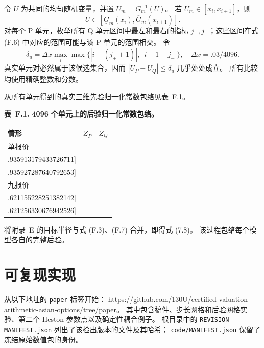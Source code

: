 令 \(U\) 为共同的均匀随机变量，并置 \(U_m=G_m^{-1}(U)\)。
若 \(U_m\in[x_i,x_{i+1}]\)，则
\[
U\in[\underline G_m(x_i),\overline G_m(x_{i+1})].
\tag{F.6}
\]
对每个 P 单元，枚举所有 Q 单元区间中最左和最右的指标 \(j_-,j_+\)；这些区间在式 (F.6) 中对应的范围可能与该 P 单元的范围相交。
令
\[
\delta_u=\Delta x\max_i\max\{|i-(j_++1)|,\ |i+1-j_-|\},
\quad \Delta x=.03/4096.
\tag{F.7}
\]
真实单元对必然属于该候选集合，因而
\(|U_P-U_Q|\le\delta_u\) 几乎处处成立。
所有比较均使用精确整数和分数。

从所有单元得到的真实三维先验归一化常数包络见表~F.1。

\noindent\textbf{表~F.1. 4096 个单元上的后验归一化常数包络。}
\begin{center}
\begin{tabularx}{\textwidth}{@{}l X X@{}}
\toprule
情形 & \(Z_P\) & \(Z_Q\) \\
\midrule
单报价 &
\(\begin{gathered}[c] [.935743002637584884,\\ .935913179433726711]\end{gathered}\) &
\(\begin{gathered}[c] [.935667223967444023,\\ .935927287640792653]\end{gathered}\) \\
\addlinespace
九报价 &
\(\begin{gathered}[c] [.620128921272339539,\\ .621155228251382142]\end{gathered}\) &
\(\begin{gathered}[c] [.619743550733119263,\\ .621256330676942526]\end{gathered}\) \\
\bottomrule
\end{tabularx}
\end{center}

将附录~E 的目标半径与式 (F.3)、(F.7) 合并，即得式 (7.8)。
该过程包络每个模型各自的完整后验。

\section{可复现实现}

从以下地址的 \texttt{paper} 标签开始：
\url{https://github.com/130U/certified-valuation-arithmetic-asian-options/tree/paper}。
其中包含稿件、步长网格和后验网格实验、第二个 Heston 参数点以及确定性耦合例子。
根目录中的 \texttt{REVISION-MANIFEST.json} 列出了该检出版本的文件及其哈希；
\texttt{code/MANIFEST.json} 保留了冻结原始数值包的身份。

